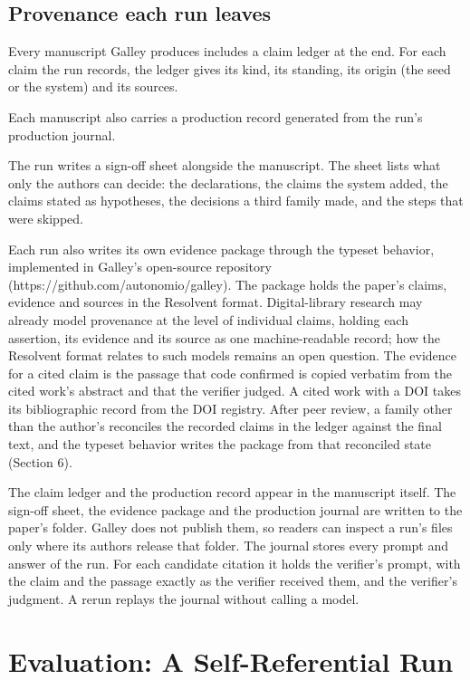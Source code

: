\documentclass[
]{article}
\begin{document}
\subsection{Provenance each run
leaves}\label{provenance-each-run-leaves}

Every manuscript Galley produces includes a claim ledger at the end. For
each claim the run records, the ledger gives its kind, its standing, its
origin (the seed or the system) and its sources.

Each manuscript also carries a production record generated from the
run's production journal.

The run writes a sign-off sheet alongside the manuscript. The sheet
lists what only the authors can decide: the declarations, the claims the
system added, the claims stated as hypotheses, the decisions a third
family made, and the steps that were skipped.

Each run also writes its own evidence package through the typeset
behavior, implemented in Galley's open-source repository
(https://github.com/autonomio/galley). The package holds the paper's
claims, evidence and sources in the Resolvent format. Digital-library
research may already model provenance at the level of individual claims,
holding each assertion, its evidence and its source as one
machine-readable record; how the Resolvent format relates to such models
remains an open question. The evidence for a cited claim is the passage
that code confirmed is copied verbatim from the cited work's abstract
and that the verifier judged. A cited work with a DOI takes its
bibliographic record from the DOI registry. After peer review, a family
other than the author's reconciles the recorded claims in the ledger
against the final text, and the typeset behavior writes the package from
that reconciled state (Section 6).

The claim ledger and the production record appear in the manuscript
itself. The sign-off sheet, the evidence package and the production
journal are written to the paper's folder. Galley does not publish them,
so readers can inspect a run's files only where its authors release that
folder. The journal stores every prompt and answer of the run. For each
candidate citation it holds the verifier's prompt, with the claim and
the passage exactly as the verifier received them, and the verifier's
judgment. A rerun replays the journal without calling a model.

\section{Evaluation: A Self-Referential
Run}\label{evaluation-a-self-referential-run}
\end{document}

